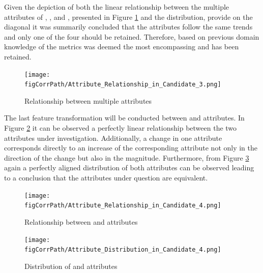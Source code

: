 \begin{enumerate}
Given the depiction of both the linear relationship between the multiple  attributes of \overallCoverage{}, \overallLineCoverage{},\coverage{} and \lineCoverage{}, presented in Figure \ref{fig:candidate3-pairplot} and the distribution, provide on the diagonal it was summarily concluded that the attributes follow the same trends and only one of the four should be retained. Therefore, based on previous domain knowledge of the metrics \overallCoverage{} was deemed the most encompassing and has been retained.
\begin{figure}[h!]
    \centering
    \texttt{[image: \\figCorrPath/Attribute\_Relationship\_in\_Candidate\_3.png]}
    \caption{Relationship between multiple attributes}
    \label{fig:candidate3-pairplot}
\end{figure}

\FloatBarrier

The last feature transformation will be conducted between \overallUncoveredConditions{} and \uncoveredConditions{} attributes. In Figure \ref{fig:candidate4-scatterplot} it can be observed a perfectly linear relationship between the two attributes under investigation. Additionally, a change in one attribute corresponds directly to an increase of the corresponding attribute not only in the direction of the change but also in the magnitude. Furthermore, from Figure \ref{fig:candidate4-distribution} again a perfectly aligned distribution of both attributes can be observed leading to a conclusion that the attributes under question are equivalent.

\begin{figure}[h!]
    \centering
    \texttt{[image: \\figCorrPath/Attribute\_Relationship\_in\_Candidate\_4.png]}
    \caption{Relationship between \overallUncoveredConditions{} and \uncoveredConditions{} attributes}
    \label{fig:candidate4-scatterplot}
\end{figure}

\begin{figure}[h!]
    \centering
    \texttt{[image: \\figCorrPath/Attribute\_Distribution\_in\_Candidate\_4.png]}
    \caption{Distribution of \overallUncoveredConditions{} and \uncoveredConditions{} attributes}
    \label{fig:candidate4-distribution}
\end{figure}


\end{enumerate}
